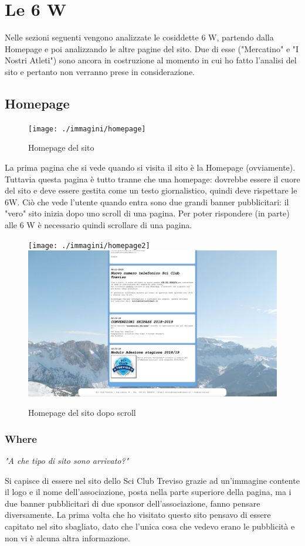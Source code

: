 
\chapter{Le 6 W}
\label{cap:le 6 w}
Nelle sezioni seguenti vengono analizzate le cosiddette 6 W, partendo dalla Homepage e poi analizzando le altre pagine del sito. Due di esse ("Mercatino" e "I Nostri Atleti") sono ancora in costruzione al momento in cui ho fatto l'analisi del sito e pertanto non verranno prese in considerazione.

\section{Homepage}
\begin{figure}[ht]
    \centering
    \texttt{[image: ./immagini/homepage]}
    \caption [Homepage del sito]{Homepage del sito \siteName}
\end{figure}
La prima pagina che si vede quando si visita il sito è la Homepage (ovviamente). Tuttavia questa pagina è tutto tranne che una homepage: dovrebbe essere il cuore del sito e deve essere gestita come un testo giornalistico, quindi deve rispettare le 6W. Ciò che vede l'utente quando entra sono due grandi banner pubblicitari: il "vero" sito inizia dopo uno scroll di una pagina. Per poter rispondere (in parte) alle 6 W è necessario quindi scrollare di una pagina.

\begin{figure}[ht] 
    \centering
    \texttt{[image: ./immagini/homepage2]}\hfil
    \includegraphics[width=.49\textwidth]{./immagini/homepage3}
    \caption [Homepage del sito 2]{Homepage del sito \siteName dopo scroll}
\end{figure}

    \subsection{Where}
        \begin{center}
            \textit{"A che tipo di sito sono arrivato?"}
        \end{center}
         Si capisce di essere nel sito dello Sci Club Treviso grazie ad un'immagine contente il logo e il nome dell'associazione, posta nella parte superiore della pagina, ma i due banner pubblicitari di due sponsor dell'associazione, fanno pensare diversamente. La prima volta che ho visitato questo sito pensavo di essere capitato nel sito sbagliato, dato che l'unica cosa che vedevo erano le pubblicità e non vi è alcuna altra informazione. 

